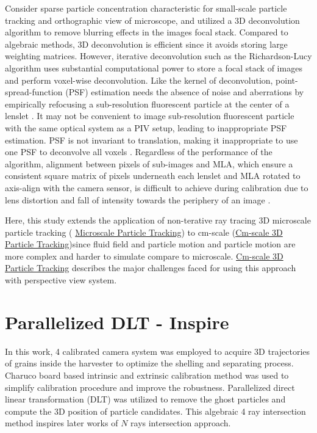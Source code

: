 \documentclass[draftthesis,fullpage]{uiucthesis}
\begin{document}
Consider sparse particle concentration characteristic for small-scale particle tracking and orthographic view of microscope, \citet{levoy2006light} and \citet{ truscott2017three} utilized a 3D deconvolution algorithm to remove blurring effects in the images focal stack. 
Compared to algebraic methods, 3D deconvolution is efficient since it avoids storing large weighting matrices. However, iterative deconvolution such as the Richardson-Lucy algorithm \citep{sibarita2005deconvolution} uses substantial computational power to store a focal stack of images and perform voxel-wise deconvolution. Like the kernel of deconvolution, point-spread-function (PSF) estimation needs the absence of noise and aberrations by empirically refocusing a sub-resolution fluorescent particle at the center of a lenslet \citep{levoy2006light}. It may not be convenient to image sub-resolution fluorescent particle with the same optical system as a PIV setup, leading to inappropriate PSF estimation. PSF is not invariant to translation, making it inappropriate to use one PSF to deconvolve all voxels \citep{zhu2021pre}. Regardless of the performance of the algorithm, alignment between pixels of sub-images and MLA, which ensure a consistent square matrix of pixels underneath each lenslet and MLA rotated to axis-align with the camera sensor, is difficult to achieve during calibration due to lens distortion and fall of intensity towards the periphery of an image \citep{piller2012microscope}.


Here, this study extends the application of non-terative ray tracing 3D microscale particle tracking ( \hyperref[chapter:MPT]{Microscale Particle Tracking}) to cm-scale (\hyperref[chapter:cm]{Cm-scale 3D Particle Tracking})since fluid field and particle motion and particle motion are more complex and harder to simulate compare to microscale. \hyperref[chapter:cm-scale]{Cm-scale 3D Particle Tracking} 
describes the major challenges faced for using this approach with perspective view system.  

\renewcommand{\cleardoublepage}{} %
\renewcommand{\clearpage}{}
\chapter{Parallelized DLT - Inspire}\label{chapter:DLT}
In this work, 4 calibrated camera system was employed to acquire 3D trajectories of grains inside the harvester to optimize the shelling and separating process. Charuco board \citep{an2018charuco} based intrinsic and extrinsic calibration method was used to simplify calibration procedure and improve the robustness. Parallelized direct linear transformation (DLT) was utilized to remove the ghost particles and compute the 3D position of particle candidates. This algebraic 4 ray intersection method inspires later works of $N$ rays intersection approach. 
\end{document}
